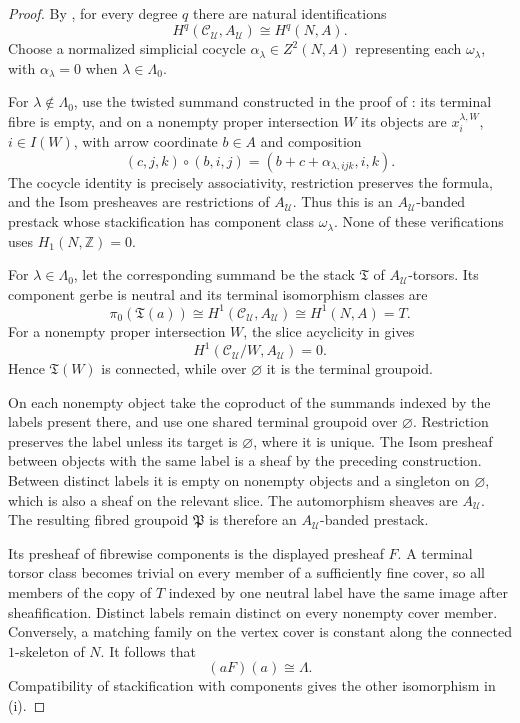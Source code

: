 \begin{proof}
By , for every degree \(q\) there are
natural identifications
\begin{equation}\label{eq:unrestricted-site-nerve-comparison}
 H^q(\mathcal C_{\mathcal U},A_{\mathcal U})
 \cong H^q(N,A).
\end{equation}
Choose a normalized simplicial cocycle
\(\alpha_\lambda\in Z^2(N,A)\) representing each
\(\omega_\lambda\), with \(\alpha_\lambda=0\) when
\(\lambda\in\Lambda_0\).

For \(\lambda\notin\Lambda_0\), use the twisted summand constructed in the
proof of : its terminal
fibre is empty, and on a nonempty proper intersection \(W\) its objects are
\(x_i^{\lambda,W}\), \(i\in I(W)\), with arrow coordinate \(b\in A\) and
composition
\[
 (c,j,k)\circ(b,i,j)
 =(b+c+\alpha_{\lambda,ijk},i,k).
\]
The cocycle identity is precisely associativity, restriction preserves the
formula, and the Isom presheaves are restrictions of
\(A_{\mathcal U}\).  Thus this is an
\(A_{\mathcal U}\)-banded prestack whose stackification has component class
\(\omega_\lambda\).  None of these verifications uses
\(H_1(N,\mathbb Z)=0\).

For \(\lambda\in\Lambda_0\), let the corresponding summand be the stack
\(\mathfrak T\) of \(A_{\mathcal U}\)-torsors.  Its component gerbe is
neutral and its terminal isomorphism classes are
\[
 \pi_0(\mathfrak T(a))
 \cong H^1(\mathcal C_{\mathcal U},A_{\mathcal U})
 \cong H^1(N,A)=T.
\]
For a nonempty proper intersection \(W\), the slice acyclicity in
 gives
\[
 H^1(\mathcal C_{\mathcal U}/W,A_{\mathcal U})=0.
\]
Hence \(\mathfrak T(W)\) is connected, while over \(\varnothing\) it is the
terminal groupoid.

On each nonempty object take the coproduct of the summands indexed by the
labels present there, and use one shared terminal groupoid over
\(\varnothing\).  Restriction preserves the label unless its target is
\(\varnothing\), where it is unique.  The Isom presheaf between objects with
the same label is a sheaf by the preceding construction.  Between distinct
labels it is empty on nonempty objects and a singleton on \(\varnothing\),
which is also a sheaf on the relevant slice.  The automorphism sheaves are
\(A_{\mathcal U}\).  The resulting fibred groupoid \(\mathfrak P\) is
therefore an \(A_{\mathcal U}\)-banded prestack.

Its presheaf of fibrewise components is the displayed presheaf \(F\).  A
terminal torsor class becomes trivial on every member of a sufficiently fine
cover, so all members of the copy of \(T\) indexed by one neutral label have
the same image after sheafification.  Distinct labels remain distinct on
every nonempty cover member.  Conversely, a matching family on the vertex
cover is constant along the connected \(1\)-skeleton of \(N\).  It follows
that
\[
 (aF)(a)\cong\Lambda.
\]
Compatibility of stackification with components gives the other isomorphism
in (i).


\end{proof}
